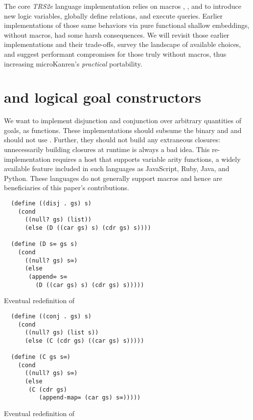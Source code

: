 \documentclass[sigplan,draft,balance,pbalance,natbib=false]{acmart}
\begin{document}
The core \emph{TRS2e} language implementation relies on
macros , , and 
to introduce new logic variables, globally define relations, and
execute queries. Earlier implementations of those same behaviors via
pure functional shallow embeddings, without macros, had some harsh
consequences. We will revisit those earlier implementations and their
trade-offs, survey the landscape of available choices, and suggest
performant compromises for those truly without macros, thus increasing
microKanren's \emph{practical} portability.

\section{ and  logical goal
  constructors}\label{sec:conde}

We want to implement disjunction and conjunction over arbitrary
quantities of goals, as functions. These implementations should
subsume the binary  and  and
should not use . Further, they should not build any
extraneous closures: unnecessarily building closures at runtime is
always a bad idea. This re-implementation requires a host that
supports variable arity functions, a widely available feature included
in such languages as JavaScript, Ruby, Java, and Python. These
languages do not generally support macros and hence are beneficiaries
of this paper's contributions.

\begin{listing}
  \begin{verbatim}
  (define ((disj . gs) s)
    (cond
      ((null? gs) (list))
      (else (D ((car gs) s) (cdr gs) s))))

  (define (D s∞ gs s)
    (cond
      ((null? gs) s∞)
      (else
       (append∞ s∞
         (D ((car gs) s) (cdr gs) s)))))
  \end{verbatim}
  \caption{Eventual redefinition of }
  \label{mnt:disj-reimplementation}
\end{listing}

\begin{listing}
  \begin{verbatim}
  (define ((conj . gs) s)
    (cond
      ((null? gs) (list s))
      (else (C (cdr gs) ((car gs) s)))))

  (define (C gs s∞)
    (cond
      ((null? gs) s∞)
      (else
       (C (cdr gs)
          (append-map∞ (car gs) s∞)))))
  \end{verbatim}
  \caption{Eventual redefinition of }
  \label{mnt:conj-reimplementation}
\end{listing}
\end{document}
